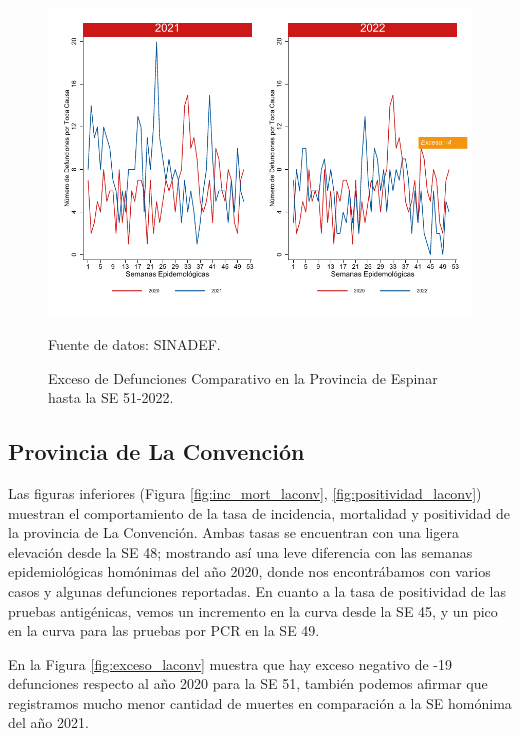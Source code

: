 \documentclass[12pt,a4paper,openany]{book}
\begin{document}
	\begin{figure}[h]
		\caption{Exceso de Defunciones Comparativo en la Provincia de Espinar hasta la SE 51-2022.}\label{fig:exceso_espinar}
		\begin{center}
			\includegraphics[width=0.7\linewidth]{../figuras/exceso_8.pdf}
		\end{center}
		{\footnotesize {Fuente de datos: SINADEF.}}
	\end{figure}
	
	\clearpage
	
	\subsection*{Provincia de La Convención}
	\noindent Las figuras inferiores (Figura \ref{fig:inc_mort_laconv}, \ref{fig:positividad_laconv}) muestran el comportamiento de la tasa de incidencia, mortalidad y positividad de la provincia de La Convención. Ambas tasas se encuentran con una ligera elevación desde la SE 48; mostrando así una leve diferencia con las semanas epidemiológicas homónimas del año 2020, donde nos encontrábamos con varios casos y algunas defunciones reportadas. En cuanto a la tasa de positividad de las pruebas antigénicas, vemos un incremento en la curva desde la SE 45, y un pico en la curva para las pruebas por PCR en la SE 49.
		
	En la Figura \ref{fig:exceso_laconv} muestra que hay exceso negativo de -19 defunciones respecto al año 2020 para la SE 51, también podemos afirmar que registramos mucho menor cantidad de muertes en comparación a la SE homónima del año 2021.    
	
\end{document}
